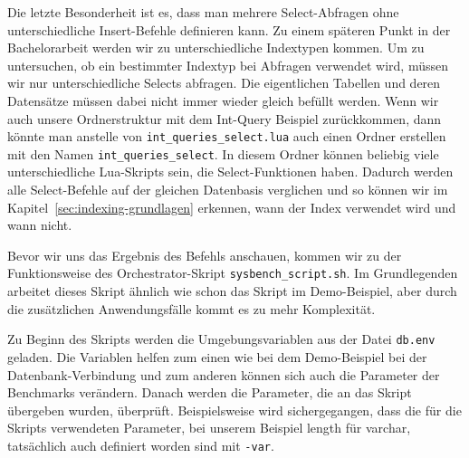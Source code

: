 Die letzte Besonderheit ist es, dass man mehrere Select-Abfragen ohne unterschiedliche Insert-Befehle definieren kann.
Zu einem späteren Punkt in der Bachelorarbeit werden wir zu unterschiedliche Indextypen kommen.
Um zu untersuchen, ob ein bestimmter Indextyp bei Abfragen verwendet wird, müssen wir nur unterschiedliche Selects abfragen.
Die eigentlichen Tabellen und deren Datensätze müssen dabei nicht immer wieder gleich befüllt werden.
Wenn wir auch unsere Ordnerstruktur mit dem Int-Query Beispiel zurückkommen, dann könnte man anstelle von \texttt{int\_queries\_select.lua} auch einen Ordner erstellen mit den Namen \texttt{int\_queries\_select}.
In diesem Ordner können beliebig viele unterschiedliche Lua-Skripts sein, die Select-Funktionen haben.
Dadurch werden alle Select-Befehle auf der gleichen Datenbasis verglichen und so können wir im Kapitel~\ref{sec:indexing-grundlagen} erkennen, wann der Index verwendet wird und wann nicht.

Bevor wir uns das Ergebnis des Befehls anschauen, kommen wir zu der Funktionsweise des Orchestrator-Skript \texttt{sysbench\_script.sh}.
Im Grundlegenden arbeitet dieses Skript ähnlich wie schon das Skript im Demo-Beispiel, aber durch die zusätzlichen Anwendungsfälle kommt es zu mehr Komplexität.

Zu Beginn des Skripts werden die Umgebungsvariablen aus der Datei \texttt{db.env} geladen.
Die Variablen helfen zum einen wie bei dem Demo-Beispiel bei der Datenbank-Verbindung und zum anderen können sich auch die Parameter der Benchmarks verändern.
Danach werden die Parameter, die an das Skript übergeben wurden, überprüft.
Beispielsweise wird sichergegangen, dass die für die Skripts verwendeten Parameter, bei unserem Beispiel length für varchar, tatsächlich auch definiert worden sind mit \texttt{-var}.

